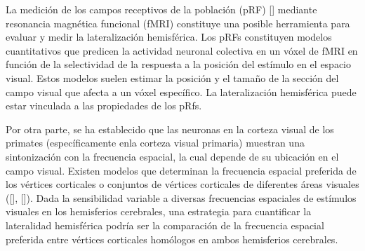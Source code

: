 

La medición de los campos receptivos de la población (pRF) [\cite{dumoulin_population_2008}] mediante resonancia magnética funcional (fMRI) constituye una posible herramienta para evaluar y medir la lateralización hemisférica. Los pRFs constituyen modelos cuantitativos que predicen la actividad neuronal colectiva en un vóxel de fMRI en función de la selectividad de la respuesta a la posición del estímulo en el espacio visual. Estos modelos suelen estimar la posición y el tamaño de la sección del campo visual que afecta a un vóxel específico. La lateralización hemisférica puede estar vinculada a las propiedades de los pRfs.

Por otra parte, se ha establecido que las neuronas en la corteza visual de los primates (específicamente enla corteza visual primaria) muestran una sintonización con la frecuencia espacial, la cual depende de su ubicación en el campo visual. Existen modelos que determinan la frecuencia espacial preferida de los v\'ertices corticales o conjuntos de v\'ertices corticales de diferentes áreas visuales ([\cite{aghajari_population_2020}], [\cite{broderick_mapping_2022}]). Dada la sensibilidad variable a diversas frecuencias espaciales de estímulos visuales en los hemisferios cerebrales, una estrategia para cuantificar la lateralidad hemisférica podría ser la comparación de la frecuencia espacial preferida entre v\'ertices corticales homólogos en ambos hemisferios cerebrales.

